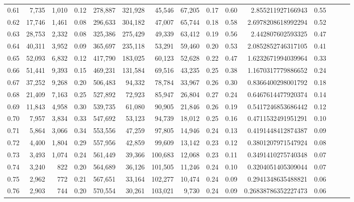\begin{tabular}{rrrrrrrrrrrrrrr}
0.61 &   7,735 &  1,010 &  0.12 &  278,887 &  321,928 &   45,546 &   67,205 &  0.17 &  0.60 &     2.855211927166943 &      0.55 \\
0.62 &  17,746 &  1,461 &  0.08 &  296,633 &  304,182 &   47,007 &   65,744 &  0.18 &  0.58 &    2.6978208618992294 &      0.52 \\
0.63 &  28,753 &  2,332 &  0.08 &  325,386 &  275,429 &   49,339 &   63,412 &  0.19 &  0.56 &     2.442807602593325 &      0.47 \\
0.64 &  40,311 &  3,952 &  0.09 &  365,697 &  235,118 &   53,291 &   59,460 &  0.20 &  0.53 &    2.0852852746317105 &      0.41 \\
0.65 &  52,093 &  6,832 &  0.12 &  417,790 &  183,025 &   60,123 &   52,628 &  0.22 &  0.47 &    1.6232671994039964 &      0.33 \\
0.66 &  51,441 &  9,393 &  0.15 &  469,231 &  131,584 &   69,516 &   43,235 &  0.25 &  0.38 &    1.1670317779886652 &      0.24 \\
0.67 &  37,252 &  9,268 &  0.20 &  506,483 &   94,332 &   78,784 &   33,967 &  0.26 &  0.30 &    0.8366400298001792 &      0.18 \\
0.68 &  21,409 &  7,163 &  0.25 &  527,892 &   72,923 &   85,947 &   26,804 &  0.27 &  0.24 &    0.6467614477920374 &      0.14 \\
0.69 &  11,843 &  4,958 &  0.30 &  539,735 &   61,080 &   90,905 &   21,846 &  0.26 &  0.19 &    0.5417246853686442 &      0.12 \\
0.70 &   7,957 &  3,834 &  0.33 &  547,692 &   53,123 &   94,739 &   18,012 &  0.25 &  0.16 &    0.4711532491951291 &      0.10 \\
0.71 &   5,864 &  3,066 &  0.34 &  553,556 &   47,259 &   97,805 &   14,946 &  0.24 &  0.13 &    0.4191448412874387 &      0.09 \\
0.72 &   4,400 &  1,804 &  0.29 &  557,956 &   42,859 &   99,609 &   13,142 &  0.23 &  0.12 &    0.3801207971547924 &      0.08 \\
0.73 &   3,493 &  1,074 &  0.24 &  561,449 &   39,366 &  100,683 &   12,068 &  0.23 &  0.11 &    0.3491410275740348 &      0.07 \\
0.74 &   3,240 &    822 &  0.20 &  564,689 &   36,126 &  101,505 &   11,246 &  0.24 &  0.10 &    0.3204051405309044 &      0.07 \\
0.75 &   2,962 &    772 &  0.21 &  567,651 &   33,164 &  102,277 &   10,474 &  0.24 &  0.09 &    0.2941348635488821 &      0.06 \\
0.76 &   2,903 &    744 &  0.20 &  570,554 &   30,261 &  103,021 &    9,730 &  0.24 &  0.09 &   0.26838786352227473 &      0.06 \\

\end{tabular}
